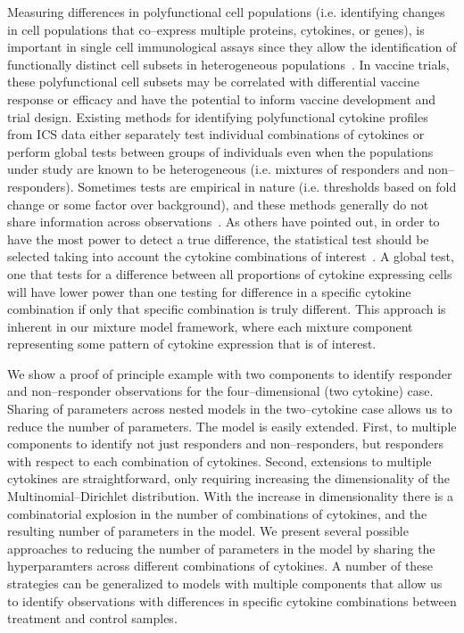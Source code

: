\documentclass[11pt]{article}
\begin{document}
Measuring differences in polyfunctional cell populations (i.e. identifying changes in cell populations that co--express multiple proteins, cytokines, or genes), is important in single cell immunological assays since they allow the identification of functionally distinct cell subsets in heterogeneous populations~\cite{Milush:2009bz}. In vaccine trials, these polyfunctional cell subsets may be correlated with differential vaccine response or efficacy and have the potential to inform vaccine development and trial design. Existing methods for identifying polyfunctional cytokine profiles from ICS data either separately test individual combinations of cytokines or perform global tests between groups of individuals even when the populations under study are known to be heterogeneous (i.e. mixtures of responders and non--responders).  Sometimes tests are empirical in nature (i.e. thresholds based on fold change or some factor over background), and these methods generally do not share information across observations~\cite{Dittrich:2012bv,Trigona:2003,Sinclair:2004hs,Horton:2007tsa,Proschan:2009ks,Nason:2006dx}. As others have pointed out, in order to have the most power to detect a true difference, the statistical test should be selected taking into account the cytokine combinations of interest~\cite{Nason:2006dx}. A global test, one that tests for a difference between all proportions of cytokine expressing cells will have lower power than one testing for difference in a specific cytokine combination if only that specific combination is truly different. This approach is inherent in our mixture model framework, where each mixture component representing some pattern of cytokine expression that is of interest.

We show a proof of principle example with two components to identify responder and non--responder observations for the four--dimensional (two cytokine) case. Sharing of parameters across nested models in the two--cytokine case allows us to reduce the number of parameters. The model is easily extended. First, to multiple components to identify not just responders and non--responders, but responders with respect to each combination of cytokines. Second, extensions to multiple cytokines are straightforward, only requiring increasing the dimensionality of the Multinomial--Dirichlet distribution. With the increase in dimensionality there is a combinatorial explosion in the number of combinations of cytokines, and the resulting number of parameters in the model. We present several possible approaches to reducing the number of parameters in the model by sharing the hyperparamters across different combinations of cytokines. A number of these strategies can be generalized to models with multiple components that allow us to identify observations with differences in specific cytokine combinations between treatment and control samples.
\end{document}
